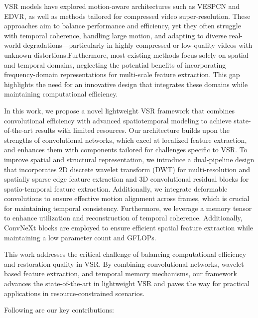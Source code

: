 \documentclass[11pt]{article}
\begin{document}
VSR models have explored motion-aware architectures such as VESPCN\cite{vespcn} and EDVR\cite{wang2019edvr}, as well as methods tailored for compressed video super-resolution\cite{Guan2019MFQE2A}. These approaches aim to balance performance and efficiency, yet they often struggle with temporal coherence, handling large motion, and adapting to diverse real-world degradations—particularly in highly compressed or low-quality videos with unknown distortions.Furthermore, most existing methods focus solely on spatial and temporal domains, neglecting the potential benefits of incorporating frequency-domain representations for multi-scale feature extraction. This gap highlights the need for an innovative design that integrates these domains while maintaining computational efficiency.

In this work, we propose a novel lightweight VSR framework that combines convolutional efficiency with advanced spatiotemporal modeling to achieve state-of-the-art results with limited resources. Our architecture builds upon the strengths of convolutional networks, which excel at localized feature extraction, and enhances them with components tailored for challenges specific to VSR. To improve spatial and structural representation, we introduce a dual-pipeline design that incorporates 2D discrete wavelet transform (DWT) for multi-resolution and spatially sparse edge feature extraction and 3D convolutional residual blocks for spatio-temporal feature extraction. Additionally, we integrate deformable convolutions to ensure effective motion alignment across frames, which is crucial for maintaining temporal consistency. Furthermore, we leverage a memory tensor to enhance utilization and reconstruction of temporal coherence. Additionally, ConvNeXt blocks are employed to ensure efficient spatial feature extraction while maintaining a low parameter count and GFLOPs. 

This work addresses the critical challenge of balancing computational efficiency and restoration quality in VSR. By combining convolutional networks, wavelet-based feature extraction, and temporal memory mechanisms, our framework advances the state-of-the-art in lightweight VSR and paves the way for practical applications in resource-constrained scenarios.


Following are our key contributions:
\end{document}
